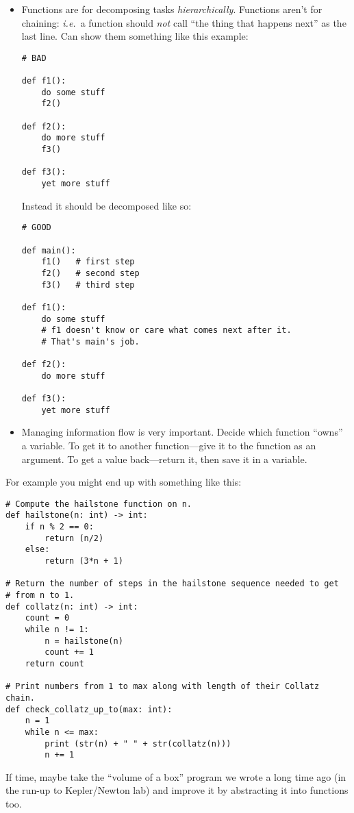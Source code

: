 \documentclass{article}
\begin{document}
\begin{itemize}
\item Functions are for decomposing tasks \emph{hierarchically}.
  Functions aren't for chaining: \emph{i.e.}\ a function should \emph{not}
  call ``the thing that happens next'' as the last line. Can show them
  something like this example:
\begin{verbatim}
# BAD

def f1():
    do some stuff
    f2()

def f2():
    do more stuff
    f3()

def f3():
    yet more stuff
\end{verbatim}
  Instead it should be decomposed like so:
\begin{verbatim}
# GOOD

def main():
    f1()   # first step
    f2()   # second step
    f3()   # third step

def f1():
    do some stuff
    # f1 doesn't know or care what comes next after it.
    # That's main's job.

def f2():
    do more stuff

def f3():
    yet more stuff
\end{verbatim}
\item Managing information flow is very important.  Decide which
  function ``owns'' a variable.  To get it to another function---give
  it to the function as an argument.  To get a value back---return it,
  then save it in a variable.
\end{itemize}

For example you might end up with something like this:

\begin{verbatim}
# Compute the hailstone function on n.
def hailstone(n: int) -> int:
    if n % 2 == 0:
        return (n/2)
    else:
        return (3*n + 1)

# Return the number of steps in the hailstone sequence needed to get
# from n to 1.
def collatz(n: int) -> int:
    count = 0
    while n != 1:
        n = hailstone(n)
        count += 1
    return count

# Print numbers from 1 to max along with length of their Collatz chain.
def check_collatz_up_to(max: int):
    n = 1
    while n <= max:
        print (str(n) + " " + str(collatz(n)))
        n += 1
\end{verbatim}

If time, maybe take the ``volume of a box'' program we wrote a long
time ago (in the run-up to Kepler/Newton lab) and improve it by
abstracting it into functions too.
\end{document}
